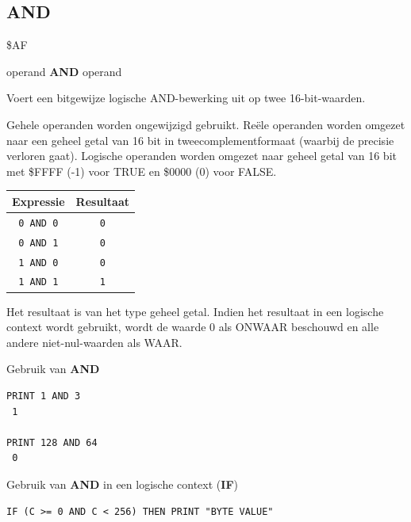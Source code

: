 \subsection{AND}
\begin{description}[leftmargin=2cm,style=nextline]
\item [Token:]    \$AF

\item [Formaat:]   operand {\bf AND} operand

\item [Gebruik:]    Voert een bitgewijze logische AND-bewerking uit op twee 16-bit-waarden.

                  Gehele operanden worden ongewijzigd gebruikt. Reële operanden worden omgezet naar een geheel getal van 16 bit in tweecomplementformaat (waarbij de precisie verloren gaat). Logische operanden worden omgezet naar geheel getal van 16 bit met \$FFFF (-1) voor TRUE en \$0000 (0) voor FALSE.

                  \begin{center}
                  \setlength{\tabcolsep}{1mm}
                  \begin{tabular}{|c|c|}
                     \hline
                        {\bf Expressie} & {\bf Resultaat}  \\
                     \hline
                        \texttt{0 AND 0} & \texttt{0} \\                     \texttt{0 AND 1} & \texttt{0} \\                        \texttt{1 AND 0} & \texttt{0} \\                        \texttt{1 AND 1} & \texttt{1} \\
                     \hline
                  \end{tabular}
                  \end{center}

\item [Opmerkingen:]  Het resultaat is van het type geheel getal. Indien het resultaat in een logische context wordt gebruikt, wordt de waarde 0 als ONWAAR beschouwd en alle andere niet-nul-waarden als WAAR.

\item [Voorbeelden:] Gebruik van {\bf AND}

\begin{tcolorbox}[colback=black,coltext=white]
\verbatimfont{\codefont}
\begin{verbatim}
PRINT 1 AND 3
 1

PRINT 128 AND 64
 0
\end{verbatim}
\end{tcolorbox}

                  Gebruik van {\bf AND} in een logische context ({\bf IF})

\begin{tcolorbox}[colback=black,coltext=white]
\verbatimfont{\codefont}
\begin{verbatim}
IF (C >= 0 AND C < 256) THEN PRINT "BYTE VALUE"
\end{verbatim}
\end{tcolorbox}
\end{description}


